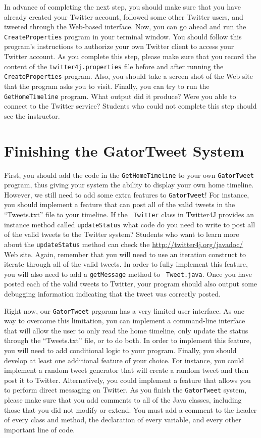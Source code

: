 In advance of completing the next step, you should make sure that you have already created your Twitter account, followed some
other Twitter users, and tweeted through the Web-based interface. Now, you can go ahead and run the {\tt CreateProperties}
program in your terminal window.  You should follow this program's instructions to authorize your own Twitter client to access
your Twitter account.  As you complete this step, please make sure that you record the content of the {\tt twitter4j.properties}
file before and after running the {\tt CreateProperties} program.  Also, you should take a screen shot of the Web site that the
program asks you to visit. Finally, you can try to run the {\tt GetHomeTimeline} program.  What output did it produce? Were you
able to connect to the Twitter service? Students who could not complete this step should see the instructor.

\section*{Finishing the GatorTweet System}
  
First, you should add the code in the {\tt GetHomeTimeline} to your own {\tt GatorTweet} program, thus giving your system the
ability to display your own home timeline.  However, we still need to add some extra features to {\tt GatorTweet}!  For instance,
you should implement a feature that can post all of the valid tweets in the ``Tweets.txt'' file to your timeline.  If the {\tt
  Twitter} class in Twitter4J provides an instance method called {\tt updateStatus} what code do you need to write to post all of
the valid tweets to the Twitter system?  Students who want to learn more about the {\tt updateStatus} method can check the
\url{http://twitter4j.org/javadoc/} Web site.  Again, remember that you will need to use an iteration construct to iterate through
all of the valid tweets.  In order to fully implement this feature, you will also need to add a {\tt getMessage} method to {\tt
  Tweet.java}. Once you have posted each of the valid tweets to Twitter, your program should also output some debugging
information indicating that the tweet was correctly posted.  

  Right now, our {\tt GatorTweet} prgoram has a very limited user interface.  As one way to overcome this limitation, you can 
  implement a command-line interface that will allow the user to only read the home timeline, only update the status through the
  ``Tweets.txt'' file, or to do both.  In order to implement this feature, you will need to add conditional logic to your program.
  Finally, you should develop at least one additional feature of your choice.  For instance, you could implement a random tweet
  generator that will create a random tweet and then post it to Twitter. Alternatively, you could implement a feature that allows
  you to perform direct messaging on Twitter. As you finish the {\tt GatorTweet} system, please make sure that you add comments to
  all of the Java classes, including those that you did not modify or extend. You must add a comment to the header of every
  class and method, the declaration of every variable, and every other important line of code. 

